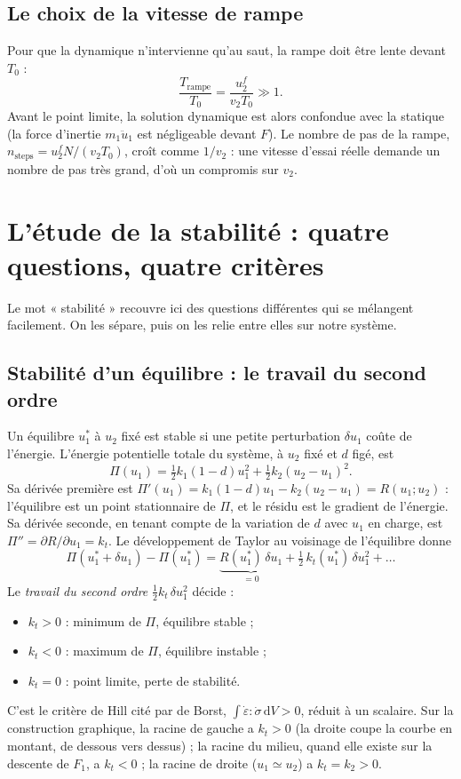 \documentclass[11pt,a4paper]{article}
\newcommand{\dd}{\mathrm{d}}
\begin{document}
\subsection{Le choix de la vitesse de rampe}
Pour que la dynamique n'intervienne qu'au saut, la rampe doit être lente devant $T_0$ :
\begin{equation}
  \frac{T_{\text{rampe}}}{T_0} = \frac{u_2^f}{v_2T_0} \gg 1 .
\end{equation}
Avant le point limite, la solution dynamique est alors confondue avec la statique (la force
d'inertie $m_1\ddot u_1$ est négligeable devant $F$). Le nombre de pas de la rampe,
$n_{\text{steps}} = u_2^f N/(v_2T_0)$, croît comme $1/v_2$ : une vitesse d'essai réelle demande un
nombre de pas très grand, d'où un compromis sur $v_2$.

\section{L'étude de la stabilité : quatre questions, quatre critères}
\label{sec:stab}
Le mot « stabilité » recouvre ici des questions différentes qui se mélangent facilement. On
les sépare, puis on les relie entre elles sur notre système.

\subsection{Stabilité d'un équilibre : le travail du second ordre}
Un équilibre $u_1^*$ à $u_2$ fixé est stable si une petite perturbation $\delta u_1$ coûte de
l'énergie. L'énergie potentielle totale du système, à $u_2$ fixé et $d$ figé, est
\begin{equation}
  \Pi(u_1) = \tfrac12 k_1(1-d)u_1^2 + \tfrac12 k_2(u_2-u_1)^2 .
\end{equation}
Sa dérivée première est $\Pi'(u_1) = k_1(1-d)u_1 - k_2(u_2-u_1) = R(u_1;u_2)$ : l'équilibre est un
point stationnaire de $\Pi$, et le résidu est le gradient de l'énergie. Sa dérivée seconde,
en tenant compte de la variation de $d$ avec $u_1$ en charge, est $\Pi'' = \partial R/\partial u_1 = k_t$.
Le développement de Taylor au voisinage de l'équilibre donne
\begin{equation}
  \Pi(u_1^*+\delta u_1) - \Pi(u_1^*) = \underbrace{R(u_1^*)\,\delta u_1}_{=0} + \tfrac12\,k_t(u_1^*)\,\delta u_1^2 + \ldots
\end{equation}
Le \emph{travail du second ordre} $\tfrac12k_t\,\delta u_1^2$ décide :
\begin{itemize}[nosep]
  \item $k_t > 0$ : minimum de $\Pi$, équilibre stable ;
  \item $k_t < 0$ : maximum de $\Pi$, équilibre instable ;
  \item $k_t = 0$ : point limite, perte de stabilité.
\end{itemize}
C'est le critère de Hill cité par de Borst, $\int\dot\varepsilon:\dot\sigma\,\dd V > 0$, réduit à un
scalaire. Sur la construction graphique, la racine de gauche a $k_t > 0$ (la droite coupe la
courbe en montant, de dessous vers dessus) ; la racine du milieu, quand elle existe sur la
descente de $F_1$, a $k_t < 0$ ; la racine de droite ($u_1\simeq u_2$) a $k_t = k_2 > 0$.
\end{document}
